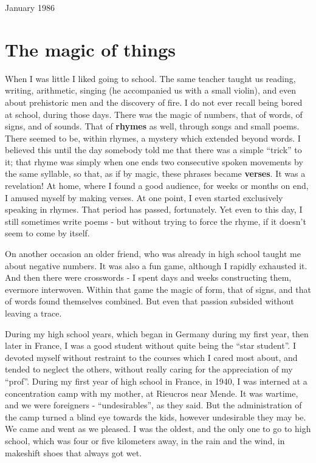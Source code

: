January 1986

\section{The magic of things}

When I was little I liked going to school. The same teacher taught us reading,
writing, arithmetic, singing (he accompanied us with a small violin), and even
about prehistoric men and the discovery of fire.
I do not ever recall being bored at school, during those days.
There was the magic of numbers, that of words, of signs, and of sounds.
That of \textbf{rhymes} as well, through songs and small poems. 
There seemed to be, within rhymes, a mystery which extended beyond words.
I believed this until the day somebody told me that there was a simple ``trick'' to it;
that rhyme was simply when one ends
two consecutive spoken movements by the same syllable, so that, as if by magic, these
phrases became \textbf{verses}. It was a revelation! 
At home, where I found a good audience, for weeks or months on end, I amused myself by
making verses. At one point, I even started exclusively speaking in rhymes. 
That period has passed, fortunately. 
Yet even to this day, I still sometimes write poems - but without trying to force the
rhyme, if it doesn't seem to come by itself. 

On another occasion an older friend, who was already in high school taught me about
negative numbers. It was also a fun game, although I rapidly exhausted it. 
And then there were crosswords - I spent days and weeks constructing them, evermore
interwoven. Within that game the magic of form, that of signs, and that of words found
themselves combined. But even that passion subsided without leaving a trace. 

During my high school years, which began in Germany during my first year, then later in
France, I was a good student without quite being the ``star student''.
I devoted myself without restraint to the
courses which I cared most about, and tended to neglect the others, without really caring
for the appreciation of my ``prof''. 
During my first year of high school in France, in 1940, I was interned at a concentration
camp with my mother, at Rieucros near Mende. It was wartime, and we were foreigners -
``undesirables'', as they said. But the administration of the camp turned a blind eye
towards the kids, however undesirable they may be. We came and went as we pleased. 
I was the oldest, and the only one to go to high school, which was four or five kilometers
away, in the rain and the wind, in makeshift shoes 
that always got wet. 


